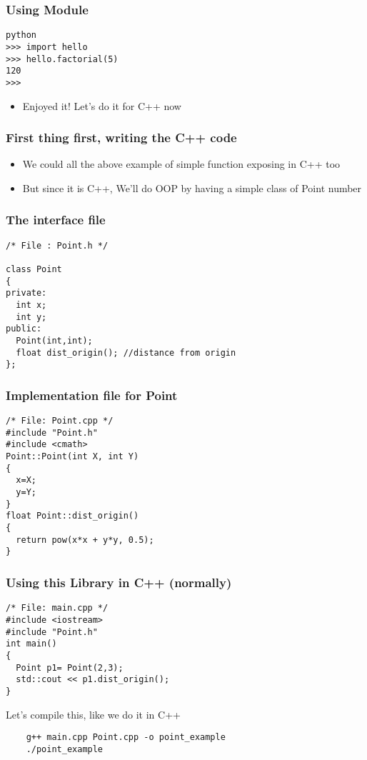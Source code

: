 \documentclass{beamer}
\begin{document}
\begin{frame}[fragile]
\frametitle{Using Module}
\label{sec-3_12}

\begin{verbatim}
python
>>> import hello
>>> hello.factorial(5)
120
>>>
\end{verbatim}

\begin{itemize}
\item Enjoyed it! Let's do it for C++ now
\end{itemize}
\end{frame}
\begin{frame}
\frametitle{First thing first, writing the C++ code}
\label{sec-3_13}


\begin{itemize}
\item We could all the above example of simple function exposing in C++ too
\item But since it is C++, We'll  do OOP by having a simple class of Point number
\end{itemize}
\end{frame}
\begin{frame}[fragile]
\frametitle{The interface file}
\label{sec-3_14}

\begin{verbatim}
/* File : Point.h */

class Point
{
private:
  int x;
  int y;
public:
  Point(int,int);
  float dist_origin(); //distance from origin
};
\end{verbatim}
\end{frame}
\begin{frame}[fragile]
\frametitle{Implementation file for Point}
\label{sec-3_15}

\begin{verbatim}
/* File: Point.cpp */
#include "Point.h"
#include <cmath>
Point::Point(int X, int Y)
{
  x=X;
  y=Y;
}
float Point::dist_origin()
{
  return pow(x*x + y*y, 0.5);
}
\end{verbatim}
\end{frame}
\begin{frame}[fragile]
\frametitle{Using this Library in C++ (normally)}
\label{sec-3_16}

\begin{verbatim}
/* File: main.cpp */
#include <iostream>
#include "Point.h"
int main()
{
  Point p1= Point(2,3);
  std::cout << p1.dist_origin();
}
\end{verbatim}
   Let's compile this, like we do it in C++
\begin{verbatim}
    g++ main.cpp Point.cpp -o point_example
    ./point_example
\end{verbatim}

   
\end{frame}
\end{document}
